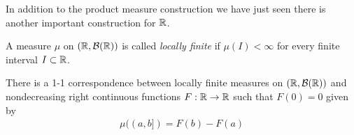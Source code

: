 In addition to the product measure construction we have just seen
there is another important construction for $\mathbb{R}$.
\begin{defn}A measure $\mu$ on $(\mathbb{R}, \mathcal{B}(\mathbb{R}))$ is called
  \emph{locally finite} if $\mu(I) < \infty$ for every finite interval
  $I \subset \mathbb{R}$.
\end{defn}
\begin{lem}\label{LebesgueStieltjesMeasure}There is a 1-1
  correspondence between locally finite measures on $(\mathbb{R},\mathcal{B}(\mathbb{R}))$ and
  nondecreasing right continuous functions $F : \mathbb{R} \to \mathbb{R}$ such that $F(0)=0$ given by 
\begin{align*}
\mu((a,b]) = F(b) - F(a)
\end{align*}
\end{lem}
